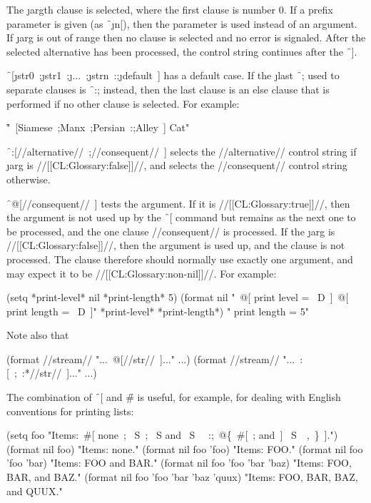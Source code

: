 The \j{arg}th
clause is selected, where the first clause is number 0.
If a prefix parameter is given (as \f{~\j{n}[}),
then the parameter is used instead of an argument.    
If \j{arg} is out of range then no clause is selected
and no error is signaled.
After the selected alternative has been processed, the control string
continues after the \f{~]}.


\f{~[\j{str0}~;\j{str1}~;\j{...}~;\j{strn}~:;\j{default}~]}
has a default case.
If the \j{last} \f{~;} used to separate clauses
is \f{~:;} instead, then the last clause is an else clause
that is performed if no other clause is selected.
For example:

\f{"~[Siamese~;Manx~;Persian~:;Alley~] Cat"}



\f{~:[//alternative//~;//consequent//~]} 
selects the //alternative// control string if \j{arg} is //[[CL:Glossary:false]]//,
and selects the //consequent// control string otherwise.
                                                             

\f{~@[//consequent//~]} 
tests the argument.  If it is //[[CL:Glossary:true]]//,           
then the argument is not used up by the \f{~[} command
but remains as the next one to be processed,
and the one clause //consequent// is processed.
If the \j{arg} is //[[CL:Glossary:false]]//, then the argument is used up,
and the clause is not processed.
The clause therefore should normally use exactly one argument,
and may expect it to be //[[CL:Glossary:non-nil]]//.
For example:

\code
 (setq *print-level* nil *print-length* 5)
 (format nil
        "~@[ print level = ~D~]~@[ print length = ~D~]"
        *print-level* *print-length*)
\EV  " print length = 5"
\endcode

Note also that

\code
 (format //stream// "...~@[//str//~]..." ...)
\EQ (format //stream// "...~:[~;~:*//str//~]..." ...)
\endcode


The combination of \f{~[} and \f{\#} is useful, for
example, for dealing with English conventions for printing lists:
                         
\code
 (setq foo "Items:~#[ none~; ~S~; ~S and ~S~
           ~:;~@\{~#[~; and~] ~S~\hat\ ,~\}~].")
 (format nil foo) \EV  "Items: none."
 (format nil foo 'foo) \EV  "Items: FOO."
 (format nil foo 'foo 'bar) \EV  "Items: FOO and BAR."
 (format nil foo 'foo 'bar 'baz) \EV  "Items: FOO, BAR, and BAZ."
 (format nil foo 'foo 'bar 'baz 'quux) \EV  "Items: FOO, BAR, BAZ, and QUUX."
\endcode

